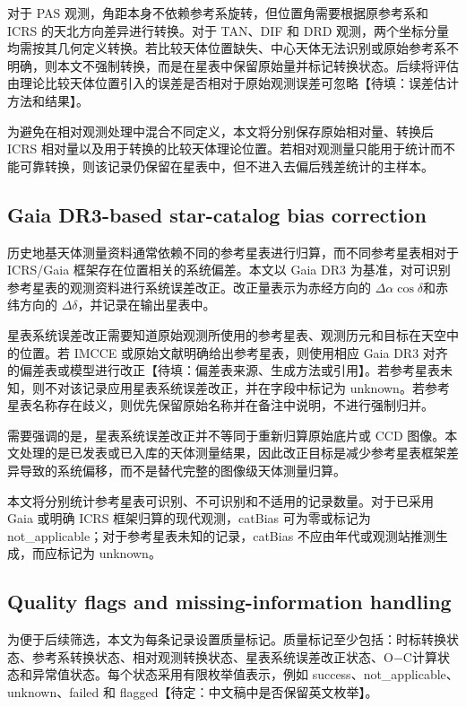\documentclass{aastex701}
\newcommand{\oc}{O$-$C}
\newcommand{\dra}{$\Delta\alpha\cos\delta$}
\newcommand{\ddec}{$\Delta\delta$}
\begin{document}
对于 PAS 观测，角距本身不依赖参考系旋转，但位置角需要根据原参考系和 ICRS 的天北方向差异进行转换。对于 TAN、DIF 和 DRD 观测，两个坐标分量均需按其几何定义转换。若比较天体位置缺失、中心天体无法识别或原始参考系不明确，则本文不强制转换，而是在星表中保留原始量并标记转换状态。后续将评估由理论比较天体位置引入的误差是否相对于原始观测误差可忽略【待填：误差估计方法和结果】。

为避免在相对观测处理中混合不同定义，本文将分别保存原始相对量、转换后 ICRS 相对量以及用于转换的比较天体理论位置。若相对观测量只能用于统计而不能可靠转换，则该记录仍保留在星表中，但不进入去偏后残差统计的主样本。

\subsection{Gaia DR3-based star-catalog bias correction} \label{subsec:debias}

历史地基天体测量资料通常依赖不同的参考星表进行归算，而不同参考星表相对于 ICRS/Gaia 框架存在位置相关的系统偏差。本文以 Gaia DR3 为基准，对可识别参考星表的观测资料进行系统误差改正。改正量表示为赤经方向的 \dra 和赤纬方向的 \ddec，并记录在输出星表中。

星表系统误差改正需要知道原始观测所使用的参考星表、观测历元和目标在天空中的位置。若 IMCCE 或原始文献明确给出参考星表，则使用相应 Gaia DR3 对齐的偏差表或模型进行改正【待填：偏差表来源、生成方法或引用】。若参考星表未知，则不对该记录应用星表系统误差改正，并在字段中标记为 unknown。若参考星表名称存在歧义，则优先保留原始名称并在备注中说明，不进行强制归并。

需要强调的是，星表系统误差改正并不等同于重新归算原始底片或 CCD 图像。本文处理的是已发表或已入库的天体测量结果，因此改正目标是减少参考星表框架差异导致的系统偏移，而不是替代完整的图像级天体测量归算。

本文将分别统计参考星表可识别、不可识别和不适用的记录数量。对于已采用 Gaia 或明确 ICRS 框架归算的现代观测，catBias 可为零或标记为 not\_applicable；对于参考星表未知的记录，catBias 不应由年代或观测站推测生成，而应标记为 unknown。

\subsection{Quality flags and missing-information handling} \label{subsec:flags}

为便于后续筛选，本文为每条记录设置质量标记。质量标记至少包括：时标转换状态、参考系转换状态、相对观测转换状态、星表系统误差改正状态、\oc 计算状态和异常值状态。每个状态采用有限枚举值表示，例如 success、not\_applicable、unknown、failed 和 flagged【待定：中文稿中是否保留英文枚举】。
\end{document}
